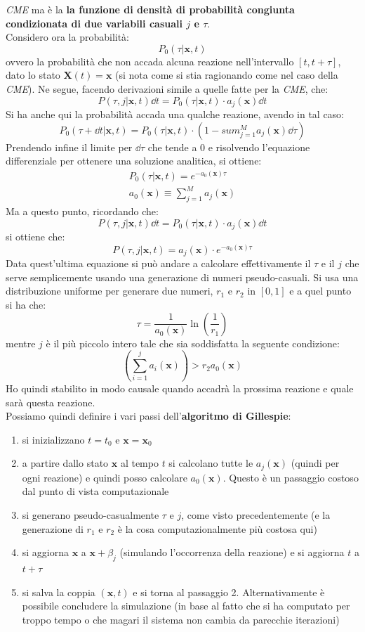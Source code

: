 \documentclass[a4paper,12pt, oneside]{book}
\begin{document}
\textit{CME} ma è la \textbf{la funzione di densità di probabilità congiunta
  condizionata di due variabili casuali $j$ e $\tau$}.\\ 
Considero ora la probabilità:
\[P_0(\tau|\mathbf{x},t)\]
ovvero la probabilità che
non accada alcuna reazione nell'intervallo $[t,t+\tau]$, dato lo stato
$\mathbf{X}(t)=\mathbf{x}$ (si nota come si stia ragionando come nel caso della
\textit{CME}). Ne segue, facendo derivazioni simile a quelle fatte per la
\textit{CME}, che: 
\[P(\tau,j|\mathbf{x},t)\dd{t}=P_0(\tau|\mathbf{x},t)\cdot
  a_j(\mathbf{x})\dd{t}\]
Si ha anche qui la probabilità accada una qualche reazione, avendo in tal caso:
\[P_0(\tau+\dd{t}|\mathbf{x},t)=P_0(\tau|\mathbf{x},t)\cdot\left(1-sum_{j=1}^M
    a_j(\mathbf{x})\dd{\tau}\right)\]
Prendendo infine il limite per $\dd{\tau}$ che tende a 0 e risolvendo
l'equazione differenziale per ottenere una soluzione analitica, si ottiene:
\begin{gather*} 
  P_0(\tau|\mathbf{x},t)=e^{-a_0(\mathbf{x})\tau}\\
  a_0(\mathbf{x})\equiv \sum_{j=1}^M a_j(\mathbf{x})
\end{gather*}
Ma a questo punto, ricordando che:
\[P(\tau,j|\mathbf{x},t)\dd{t}=P_0(\tau|\mathbf{x},t)\cdot
  a_j(\mathbf{x})\dd{t}\]
si ottiene che:
\[P(\tau,j|\mathbf{x},t)=a_j(\mathbf{x})\cdot e^{-a_0(\mathbf{x})\tau}\]
Data quest'ultima equazione si può andare a calcolare effettivamente il $\tau$
e il $j$ che serve semplicemente usando una generazione di numeri
pseudo-casuali. Si usa una distribuzione uniforme per generare due numeri, $r_1$
e $r_2$ in $[0,1]$ e a quel punto si ha che:
\[\tau=\frac{1}{a_0(\mathbf{x})}\ln\left(\frac{1}{r_1}\right)\]
mentre $j$ è il più piccolo intero tale che sia soddisfatta la seguente
condizione: 
\[\left(\sum_{i=1}^ja_i(\mathbf{x})\right)>r_2a_0(\mathbf{x})\]
Ho quindi stabilito in modo causale quando accadrà la prossima reazione e quale
sarà questa reazione. \\
Possiamo quindi definire i vari passi dell'\textbf{algoritmo di Gillespie}:
\begin{enumerate}
  \item si inizializzano $t=t_0$ e $\mathbf{x}=\mathbf{x}_0$
  \item a partire dallo stato $\mathbf{x}$ al tempo $t$ si calcolano tutte le
  $a_j(\mathbf{x})$ (quindi per ogni reazione) e quindi posso calcolare
  $a_0(\mathbf{x})$. Questo è un passaggio costoso dal punto di vista
  computazionale 
  \item si generano pseudo-casualmente $\tau$ e $j$, come visto precedentemente
  (e la generazione di $r_1$ e $r_2$ è la cosa computazionalmente più costosa
  qui) 
  \item si aggiorna $\mathbf{x}$ a $\mathbf{x}+\beta_j$ (simulando l'occorrenza
  della reazione) e si aggiorna $t$ a $t+\tau$
  \item si salva la coppia $(\mathbf{x}, t)$ e si torna al passaggio 2.
  Alternativamente è possibile concludere la simulazione (in base al fatto che
  si ha computato per troppo tempo o che magari il sistema non cambia da
  parecchie iterazioni)
\end{enumerate}
\end{document}
